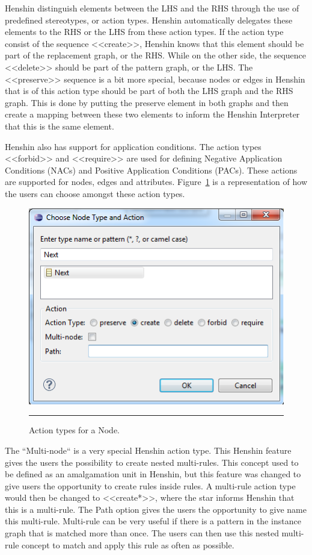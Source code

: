 Henshin distinguish elements between the LHS and the RHS through the
use of predefined stereotypes, or action types. Henshin automatically delegates
these elements to the RHS or the LHS from these action types. If the action type
consist of the sequence <<create>>, Henshin knows that this element should be
part of the replacement graph, or the RHS. While on the other side, the sequence
<<delete>> should be part of the pattern graph, or the LHS. The <<preserve>>
sequence is a bit more special, because nodes or edges in Henshin that is of
this action type should be part of both the LHS graph and the RHS graph. This is
done by putting the preserve element in both graphs and then create a mapping
between these two elements to inform the Henshin Interpreter that this is the
same element.

Henshin also has support for application conditions. The action types <<forbid>>
and <<require>> are used for defining Negative Application Conditions (NACs)
and Positive Application Conditions (PACs). These actions are supported for
nodes, edges and attributes. Figure~\ref{fig:HenshinAction} is a representation
of how the users can choose amongst these action types.  

\begin{figure}[H]
	\centering
	\includegraphics[scale=0.5]{figures/Henshin_Action.png}
	\rule{35em}{0.5pt}
	\caption[Action type for Henshin]
	{Action types for a Node.}
	\label{fig:HenshinAction}
\end{figure}

The ``Multi-node`` is a very special Henshin action type. This Henshin
feature gives the users the possibility to create nested multi-rules. This
concept used to be defined as an amalgamation unit in Henshin, but this feature
was changed to give users the opportunity to create rules inside rules. A
multi-rule action type would then be changed to <<create*>>, where the star
informs Henshin that this is a multi-rule. The Path option gives the users
the opportunity to give name this multi-rule. Multi-rule can be very useful if
there is a pattern in the instance graph that is matched more than once. The
users can then use this nested multi-rule concept to match and apply this rule
as often as possible.

